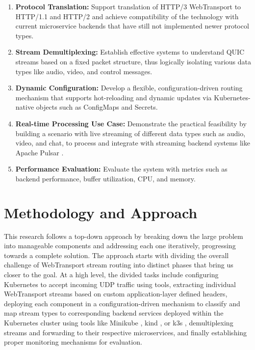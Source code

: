 \begin{enumerate}
\item \textbf{Protocol Translation:} Support translation of HTTP/3 WebTransport to HTTP/1.1 and HTTP/2 \cite{rfc7540} and achieve compatibility of the technology with current microservice backends that have still not implemented newer protocol types.

\item \textbf{Stream Demultiplexing:} Establish effective systems to understand QUIC streams based on a fixed packet structure, thus logically isolating various data types like audio, video, and control messages.

\item \textbf{Dynamic Configuration:} Develop a flexible, configuration-driven routing mechanism that supports hot-reloading and dynamic updates via Kubernetes-native objects such as ConfigMaps and Secrets.

\item \textbf{Real-time Processing Use Case:} Demonstrate the practical feasibility by building a scenario with live streaming of different data types such as audio, video, and chat, to process and integrate with streaming backend systems like Apache Pulsar \cite{pulsar-helm-repo}.

\item \textbf{Performance Evaluation:} Evaluate the system with metrics such as backend performance, buffer utilization, CPU, and memory.

\end{enumerate}

\section{Methodology and Approach}

This research follows a top-down approach by breaking down the large problem into manageable components and addressing each one iteratively, progressing towards a complete solution. The approach starts with dividing the overall challenge of WebTransport stream routing into distinct phases that bring us closer to the goal. At a high level, the divided tasks include configuring Kubernetes \cite{kubernetes-docs} to accept incoming UDP traffic using tools, extracting individual WebTransport streams based on custom application-layer defined headers, deploying each component in a configuration-driven mechanism to classify and map stream types to corresponding backend services deployed within the Kubernetes cluster using tools like Minikube \cite{minikube-docs}, kind \cite{kind-docs}, or k3s \cite{k3s-docs}, demultiplexing streams and forwarding to their respective microservices, and finally establishing proper monitoring mechanisms for evaluation.

